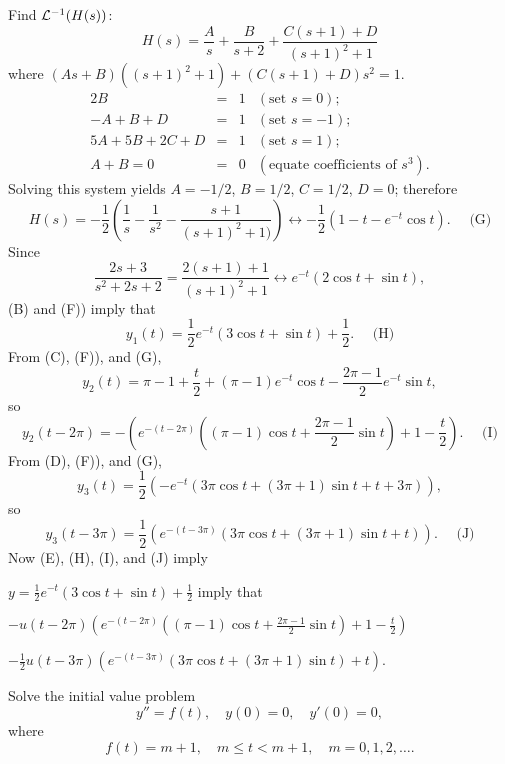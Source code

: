 \documentclass{ximera}
\begin{document}
\begin{problem}
\begin{solution}
Find ${\cal L}^{-1}(H(s))$:
$$
H(s)=\frac{A}{s}+\frac{B}{s+2}+\frac{C(s+1)+D}{(s+1)^2+1}
$$
where
$(As+B)((s+1)^2+1)+(C(s+1)+D)s^2=1$.
$$
\begin{array}{rcrl}
2B&=&1&(\mbox{set }s=0);\\
-A+B+D&=&1& (\mbox{set }s=-1);\\
5A+5B+2C+D&=&1& (\mbox{set }s=1);\\
A+B=0&=&0&(\mbox{equate coefficients of }s^3).
\end{array}
$$
Solving this system yields  $A=-1/2$, $B=1/2$, $C=1/2$, $D=0$;
therefore
\begin{equation*}
H(s)=-\frac{1}{2}\left(\frac{1}{s}-\frac{1}{s^2}-\frac{s+1}{(s+1)^2+1)}\right)
\leftrightarrow -\frac{1}{2}(1-t-e^{-t}\cos t). \quad\text{ (G)}
\end{equation*}
Since
$$
\frac{2s+3}{s^2+2s+2}=\frac{2(s+1)+1}{(s+1)^2+1}
\leftrightarrow e^{-t}(2\cos t+\sin t),
$$
(B) and (F)) imply that
\begin{equation*}
y_1(t)=\frac{1}{2}e^{-t}(3\cos t+\sin t)+\frac{1}{2}.
\quad\text{ (H)}
\end{equation*}
From (C), (F)), and (G),
$$
y_2(t)=\pi-1+\frac{t}{2}+(\pi-1) e^{-t}\cos t-\frac{2\pi-1}{2}e^{-t}\sin
t,
$$
so
\begin{equation*}
y_2(t-2\pi)=-\left(
e^{-(t-2\pi)}\left((\pi-1)\cos t+\frac{2\pi-1}{2}\sin t\right)+
1-\frac{t}{2}\right). \quad\text{ (I)}
\end{equation*}
From (D), (F)), and (G),
$$
y_3(t)=\frac{1}{2}\left(-e^{-t}(3\pi\cos t+(3\pi+1)\sin
t+t+3\pi)\right),
$$
so
\begin{equation*}
y_3(t-3\pi)=\frac{1}{2}\left(e^{-(t-3\pi)}(3\pi\cos t+(3\pi+1)\sin
t+t)\right).  \quad\text{ (J)}
\end{equation*}
Now (E), (H), (I), and (J) imply

$y=\frac{1}{2}e^{-t}(3\cos t+\sin t)+\frac{1}{2}$ imply that

$-u(t-2\pi)\left(
e^{-(t-2\pi)}\left((\pi-1)\cos t+\frac{2\pi-1}{2}\sin t\right)+
1-\frac{t}{2}\right)$

$-\frac{1}{2}u(t-3\pi)\left(e^{-(t-3\pi)}(3\pi\cos
t+(3\pi+1)\sin t
)+t\right)$.
\end{solution}
\end{problem}

\begin{problem}\label{exer:8.5.21} Solve the initial value problem $$ y''=f(t), \quad
y(0)=0,\quad  y'(0)=0, $$ where $$ f(t)=m+1,\quad m\le t<m+1,\quad
m=0,1,2,\dots. $$
\end{problem}
\end{document}
